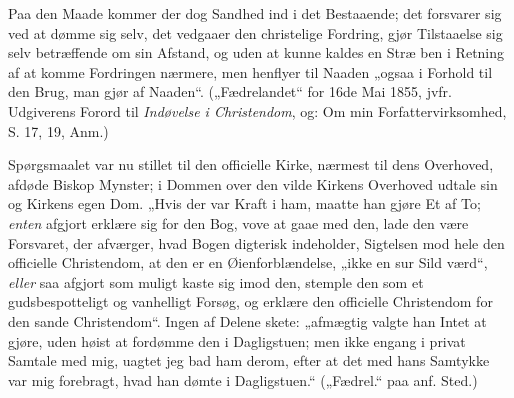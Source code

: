 \documentclass[12pt,a4paper]{book}
\begin{document}
Paa den Maade kommer der dog Sandhed ind i det Bestaaende; det forsvarer sig ved at dømme sig selv, det vedgaaer den christelige Fordring, gjør Tilstaaelse sig selv betræffende om sin Afstand, og uden at kunne kaldes en Stræ%
ben i Retning af at komme Fordringen nærmere, men henflyer til Naaden „ogsaa i Forhold til den Brug, man gjør af Naaden“. („Fædrelandet“ for 16de Mai 1855, jvfr. Udgiverens Forord til \emph{Indøvelse i Christendom}, og: Om min Forfattervirksomhed, S. 17, 19, Anm.)

Spørgsmaalet var nu stillet til den officielle Kirke, nærmest til dens Overhoved, afdøde Biskop Mynster; i Dommen over den vilde Kirkens Overhoved udtale sin og Kirkens egen Dom. „Hvis der var Kraft i ham, maatte han gjøre Et af To; \emph{enten} afgjort erklære sig for den Bog, vove at gaae med den, lade den være Forsvaret, der afværger, hvad Bogen digterisk indeholder, Sigtelsen mod hele den officielle Christendom, at den er en Øienforblændelse, „ikke en sur Sild værd“, \emph{eller} saa afgjort som muligt kaste sig imod den, stemple den som et gudsbespotteligt og vanhelligt Forsøg, og erklære den officielle Christendom for den sande Christendom“. Ingen af Delene skete: „afmægtig valgte han Intet at gjøre, uden høist at fordømme den i Dagligstuen; men ikke engang i privat Samtale med mig, uagtet jeg bad ham derom, efter at det med hans Samtykke var mig forebragt, hvad han dømte i Dagligstuen.“ („Fædrel.“ paa anf. Sted.)
\end{document}
